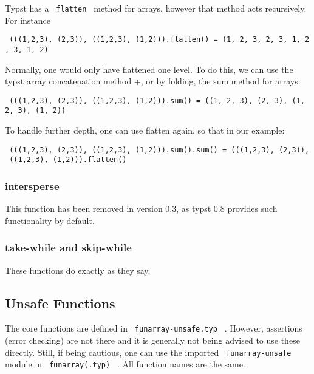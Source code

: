 Typst has a \texttt{\ flatten\ } method for arrays, however that method
acts recursively. For instance

\texttt{\ (((1,2,3),\ (2,3)),\ ((1,2,3),\ (1,2))).flatten()\ =\ (1,\ 2,\ 3,\ 2,\ 3,\ 1,\ 2,\ 3,\ 1,\ 2)\ }

Normally, one would only have flattened one level. To do this, we can
use the typst array concatenation method +, or by folding, the sum
method for arrays:

\texttt{\ (((1,2,3),\ (2,3)),\ ((1,2,3),\ (1,2))).sum()\ =\ ((1,\ 2,\ 3),\ (2,\ 3),\ (1,\ 2,\ 3),\ (1,\ 2))\ }

To handle further depth, one can use flatten again, so that in our
example:

\texttt{\ (((1,2,3),\ (2,3)),\ ((1,2,3),\ (1,2))).sum().sum()\ =\ (((1,2,3),\ (2,3)),\ ((1,2,3),\ (1,2))).flatten()\ }

\subsubsection{intersperse}\label{intersperse}

This function has been removed in version 0.3, as typst 0.8 provides
such functionality by default.

\subsubsection{take-while and
skip-while}\label{take-while-and-skip-while}

These functions do exactly as they say.

\begin{Shaded}
\begin{Highlighting}[]
\end{Highlighting}
\end{Shaded}

\subsection{Unsafe Functions}\label{unsafe-functions}

The core functions are defined in \texttt{\ funarray-unsafe.typ\ } .
However, assertions (error checking) are not there and it is generally
not being advised to use these directly. Still, if being cautious, one
can use the imported \texttt{\ funarray-unsafe\ } module in
\texttt{\ funarray(.typ)\ } . All function names are the same.

